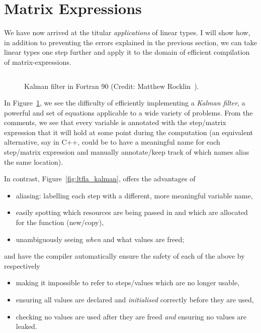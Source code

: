 \section{Matrix Expressions}

We have now arrived at the titular \emph{applications} of linear types. I will
show how, in addition to preventing the errors explained in the previous
section, we can take linear types one step further and apply it to the domain
of efficient compilation of matrix-expressions.

\begin{figure}[tb]
    \inputminted[linenos]{fortran}{kalman.f90}
    \caption{Kalman filter in Fortran 90 (Credit: Matthew
        Rocklin~\cite{rocklin_gist}).}\label{fig:fortran_kalman}
\end{figure}

In Figure~\ref{fig:fortran_kalman}, we see the difficulty of efficiently
implementing a \emph{Kalman filter}, a powerful and set of equations applicable
to a wide variety of problems. From the comments, we see that every variable is
annotated with the step/matrix expression that it will hold at some point
during the computation (an equivalent alternative, say in C++, could be to have
a meaningful name for each step/matrix expression and manually annotate/keep
track of which names alias the same location).

In contrast, Figure~\ref{fig:ltfla_kalman}, offers the advantages of
\begin{itemize}
    \item aliasing: labelling each step with a different, more meaningful variable name,
    \item easily spotting which resources are being passed in and which are
        allocated for the function (new/copy),
    \item unambiguously seeing \emph{when} and what values are freed;
\end{itemize}
and have the compiler automatically ensure the safety of each of the above by respectively
\begin{itemize}
    \item making it impossible to refer to steps/values which are no longer usable,
    \item ensuring all values are declared and \emph{initialised} correctly before they are used,
    \item checking no values are used after they are freed \emph{and} ensuring no values are leaked.
\end{itemize}

